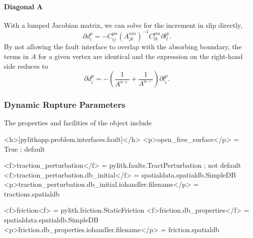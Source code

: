 \paragraph{Diagonal A}

With a lumped Jacobian matrix, we can solve for the increment in slip
directly,
\begin{equation}
\partial d_{i}^{p}=-C_{ij}^{pn}(A_{jk}^{nm})^{-1}C_{lk}^{pm}\partial l_{l}^{p}.
\end{equation}
By not allowing the fault interface to overlap with the absorbing
boundary, the terms in $A$ for a given vertex are identical and the
expression on the right-hand side reduces to
\begin{equation}
\partial d_{i}^{p}=-\left(\frac{1}{A^{n+}}+\frac{1}{A^{n-}}\right)\partial l_{i}^{p}.
\end{equation}

\subsubsection{Dynamic Rupture Parameters}

The properties and facilities of the  object include
\begin{inventory}
\end{inventory}

\begin{cfg}
<h>[pylithapp.problem.interfaces.fault]</h>
<p>open_free_surface</p> = True ; default

<f>traction_perturbation</f> = pylith.faults.TractPerturbation ; not default
<f>traction_perturbation.db_initial</f> = spatialdata.spatialdb.SimpleDB
<p>traction_perturbation.db_initial.iohandler.filename</p> = tractions.spatialdb

<f>friction<f> = pylith.friction.StaticFriction
<f>friction.db_properties</f> = spatialdata.spatialdb.SimpleDB
<p>friction.db_properties.iohandler.filename</p> = friction.spatialdb
\end{cfg}

